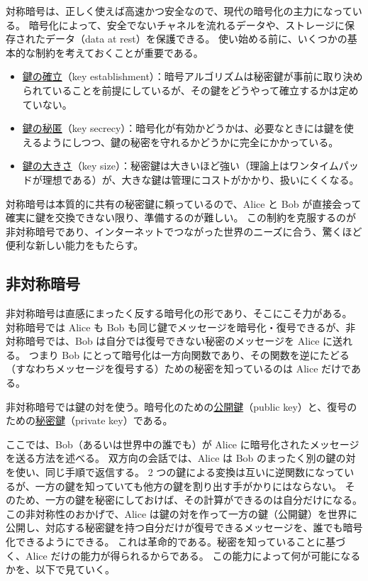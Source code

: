 \documentclass[uplatex]{jsarticle}
\def\label#1{}%
\begin{document}
対称暗号は、正しく使えば高速かつ安全なので、現代の暗号化の主力になっている。
暗号化によって、安全でないチャネルを流れるデータや、ストレージに保存されたデータ（data at rest）を保護できる。
使い始める前に、いくつかの基本的な制約を考えておくことが重要である。

\begin{rem}[対称暗号の基本的な制約]\label{rem:ch5-symmetric-limitations}
\begin{itemize}
\item \underline{鍵の確立}（key establishment）：暗号アルゴリズムは秘密鍵が事前に取り決められていることを前提にしているが、その鍵をどうやって確立するかは定めていない。
\item \underline{鍵の秘匿}（key secrecy）：暗号化が有効かどうかは、必要なときには鍵を使えるようにしつつ、鍵の秘密を守れるかどうかに完全にかかっている。
\item \underline{鍵の大きさ}（key size）：秘密鍵は大きいほど強い（理論上はワンタイムパッドが理想である）が、大きな鍵は管理にコストがかかり、扱いにくくなる。
\end{itemize}
\end{rem}

対称暗号は本質的に共有の秘密鍵に頼っているので、Alice と Bob が直接会って確実に鍵を交換できない限り、準備するのが難しい。
この制約を克服するのが非対称暗号であり、インターネットでつながった世界のニーズに合う、驚くほど便利な新しい能力をもたらす。

\subsection{非対称暗号}

非対称暗号は直感にまったく反する暗号化の形であり、そこにこそ力がある。
対称暗号では Alice も Bob も同じ鍵でメッセージを暗号化・復号できるが、非対称暗号では、Bob は自分では復号できない秘密のメッセージを Alice に送れる。
つまり Bob にとって暗号化は一方向関数であり、その関数を逆にたどる（すなわちメッセージを復号する）ための秘密を知っているのは Alice だけである。

\begin{dfn}[公開鍵と秘密鍵]\label{dfn:ch5-key-pair}
非対称暗号では鍵の対を使う。暗号化のための\underline{公開鍵}（public key）と、復号のための\underline{秘密鍵}（private key）である。
\end{dfn}

ここでは、Bob（あるいは世界中の誰でも）が Alice に暗号化されたメッセージを送る方法を述べる。
双方向の会話では、Alice は Bob のまったく別の鍵の対を使い、同じ手順で返信する。
2 つの鍵による変換は互いに逆関数になっているが、一方の鍵を知っていても他方の鍵を割り出す手がかりにはならない。
そのため、一方の鍵を秘密にしておけば、その計算ができるのは自分だけになる。
この非対称性のおかげで、Alice は鍵の対を作って一方の鍵（公開鍵）を世界に公開し、対応する秘密鍵を持つ自分だけが復号できるメッセージを、誰でも暗号化できるようにできる。
これは革命的である。秘密を知っていることに基づく、Alice だけの能力が得られるからである。
この能力によって何が可能になるかを、以下で見ていく。
\end{document}

